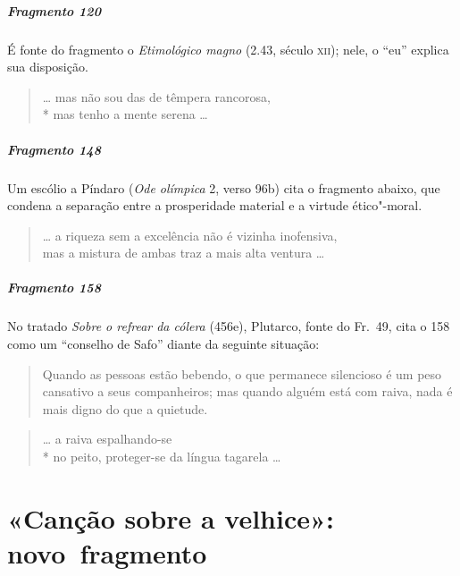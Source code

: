 \paragraph{Fragmento 120}

{\small É fonte do fragmento o \textit{Etimológico magno} (2.43, século \textsc{xii}); nele, o “eu”
explica sua disposição.}

\begin{verse}
\ldots{} mas não sou das de têmpera rancorosa,\\*
mas tenho a mente serena \ldots{}
\end{verse}

\paragraph{Fragmento 148}

{\small Um escólio a Píndaro (\textit{Ode olímpica} 2, verso 96b) cita o fragmento abaixo,
que condena a separação entre a prosperidade material e a virtude ético"-moral.}

\begin{verse}
\ldots{} a riqueza sem a excelência não é vizinha \qb{}inofensiva,\\
mas a mistura de ambas traz a mais alta \qb{}ventura \ldots{}
\end{verse}

\paragraph{Fragmento 158}

{\small No tratado \textit{Sobre o refrear da cólera} (456e), Plutarco, fonte do Fr.~49, cita o
158 como um ``conselho de Safo” diante da seguinte situação:

\begin{quote}
Quando as pessoas estão bebendo, o que permanece silencioso é um peso
cansativo a seus companheiros; mas quando alguém está com raiva, nada é mais
digno do que a quietude.
\end{quote}}

\begin{verse}
\ldots{} a raiva espalhando-se \\*
no peito, proteger-se da língua tagarela \ldots{}
\end{verse}

\chapter{«Canção sobre a velhice»: novo~fragmento}

